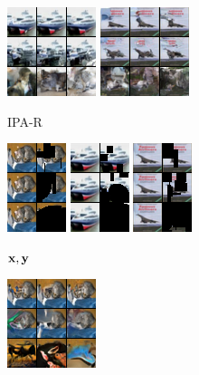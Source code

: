\begin{figure}[t]
\begin{subfigure}[t]{0.17\textwidth}
      \includegraphics[height=\cifarimgheight]{figs/cigcvae/image-samples/cifar10/freeform_aipo-r_1_samples}
      \includegraphics[height=\cifarimgheight]{figs/cigcvae/image-samples/cifar10/freeform_aipo-r_3_samples}
      \caption{\scriptsize IPA-R}
    \end{subfigure}
    \begin{subfigure}[t]{0.11\textwidth}
      \centering
      \includegraphics[height=\cifarimgheight]{figs/cigcvae/image-samples/cifar10/freeform_aipo_0_gt_masked}
      \includegraphics[height=\cifarimgheight]{figs/cigcvae/image-samples/cifar10/freeform_aipo_1_gt_masked}
      \includegraphics[height=\cifarimgheight]{figs/cigcvae/image-samples/cifar10/freeform_aipo_3_gt_masked}
      \caption*{\scriptsize ${\mathbf{x}}, {\mathbf{y}}$}
    \end{subfigure}
    \begin{subfigure}[t]{0.17\textwidth}
      \centering
      \includegraphics[height=\cifarimgheight]{figs/cigcvae/image-samples/cifar10/freeform_co_mod_gan_0_samples}

\end{subfigure}
\end{figure}
